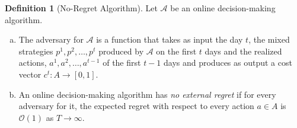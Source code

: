 \documentclass[a4paper,10pt]{article}
\theoremstyle{definition}
\newtheorem{defn}[thm]{Definition}
\begin{document}
\begin{defn}[No-Regret Algorithm]
Let $\mathcal{A}$ be an online decision-making algorithm.
\begin{enumerate}[(a)]
\item The adversary for $\mathcal{A}$ is a function that takes as input the day $t$, the mixed strategies $p^1,p^2,\ldots,p^t$ produced by $\mathcal{A}$ on the first $t$ days and the realized actions, $a^1,a^2,\ldots, a^{t-1}$ of the first $t-1$ days and produces as output a cost vector $c^t:A\to [0,1]$.
\item An online decision-making algorithm has \emph{no external regret} if for every adversary for it, the expected regret with respect to every action $a\in A$ is $\mathcal{O}(1)$ as $T \to \infty$.
\end{enumerate}
\end{defn}























































 

\end{document}
